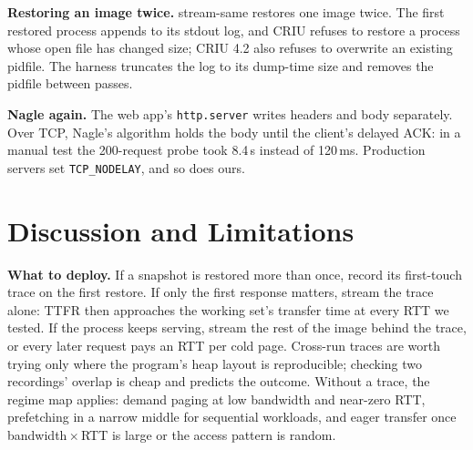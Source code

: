 \documentclass[conference]{IEEEtran}
\newcommand{\mode}[1]{\textsf{#1}}
\begin{document}
\textbf{Restoring an image twice.} \mode{stream-same} restores one image
twice. The first restored process appends to its stdout log, and CRIU
refuses to restore a process whose open file has changed size; CRIU 4.2
also refuses to overwrite an existing pidfile. The harness truncates the
log to its dump-time size and removes the pidfile between passes.

\textbf{Nagle again.} The web app's \texttt{http.server} writes headers and
body separately. Over TCP, Nagle's algorithm holds the body until the
client's delayed ACK: in a manual test the 200-request probe took 8.4\,s instead of 120\,ms.
Production servers set \texttt{TCP\_NODELAY}, and so does ours.

\section{Discussion and Limitations}

\textbf{What to deploy.} If a snapshot is restored more than once, record
its first-touch trace on the first restore. If only the first response
matters, stream the trace alone: TTFR then approaches the working set's
transfer time at every RTT we tested. If the process keeps serving, stream
the rest of the image behind the trace, or every later request pays an RTT
per cold page. Cross-run traces are worth trying only where the program's
heap layout is reproducible; checking two recordings' overlap is cheap and
predicts the outcome. Without a trace, the regime map applies: demand
paging at low bandwidth and near-zero RTT, prefetching in a narrow middle
for sequential workloads, and eager transfer once bandwidth${}\times{}$RTT
is large or the access pattern is random.
\end{document}
